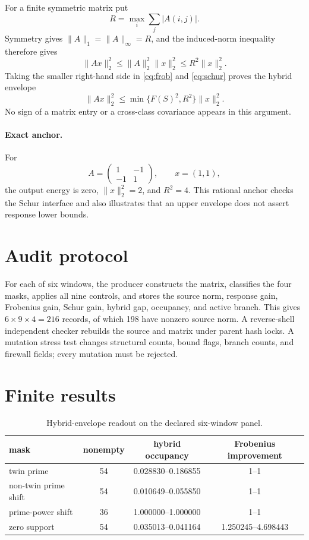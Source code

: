 \documentclass[10pt]{article}
\begin{document}
For a finite symmetric matrix put
\[
 R=\max_i\sum_j|A(i,j)|.
\]
Symmetry gives $\|A\|_1=\|A\|_\infty=R$, and the induced-norm inequality
therefore gives
\begin{equation}
 \|Ax\|_2^2\leq \|A\|_2^2\|x\|_2^2
 \leq R^2\|x\|_2^2.
 \label{eq:schur}
\end{equation}
Taking the smaller right-hand side in \eqref{eq:frob} and \eqref{eq:schur}
proves the hybrid envelope
\begin{equation}
 \|Ax\|_2^2\leq \min\{F(S)^2,R^2\}\|x\|_2^2.
 \label{eq:hybrid}
\end{equation}
No sign of a matrix entry or a cross-class covariance appears in this
argument.

\paragraph{Exact anchor.}
For
\[
 A=\begin{pmatrix}1&-1\\-1&1\end{pmatrix},\qquad x=(1,1),
\]
the output energy is zero, $\|x\|_2^2=2$, and $R^2=4$.  This rational anchor
checks the Schur interface and also illustrates that an upper envelope does
not assert response lower bounds.

\section{Audit protocol}

For each of six windows, the producer constructs the matrix, classifies the
four masks, applies all nine controls, and stores the source norm, response
gain, Frobenius gain, Schur gain, hybrid gap, occupancy, and active branch.
This gives $6\times9\times4=216$ records, of which 198 have nonzero source
norm.  A reverse-shell independent checker rebuilds the source and matrix
under parent hash locks.  A mutation stress test changes structural counts,
bound flags, branch counts, and firewall fields; every mutation must be
rejected.

\section{Finite results}

\begin{table}[ht]
\centering\small
\caption{Hybrid-envelope readout on the declared six-window panel.}
\label{tab:results}
\begin{tabular}{lccc}
\toprule
mask & nonempty & hybrid occupancy & Frobenius improvement\\
\midrule
twin prime & 54 & 0.028830--0.186855 & 1--1\\
non-twin prime shift & 54 & 0.010649--0.055850 & 1--1\\
prime-power shift & 36 & 1.000000--1.000000 & 1--1\\
zero support & 54 & 0.035013--0.041164 & 1.250245--4.698443\\
\bottomrule
\end{tabular}
\end{table}
\end{document}
